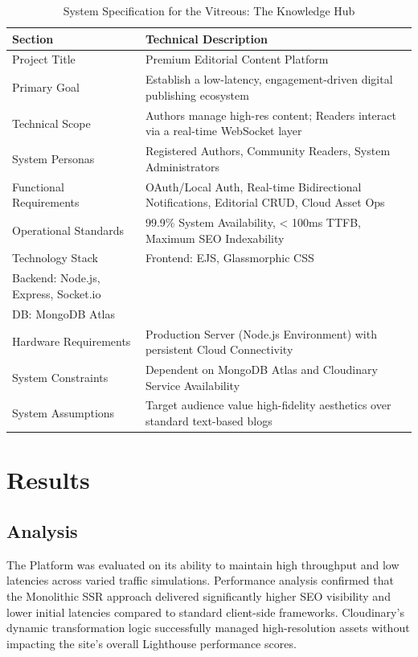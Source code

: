 \documentclass[12pt,a4paper]{report}
\begin{document}
\begin{table}[H]
\centering
\begin{tabular}{|p{4cm}|p{10cm}|}
\hline
\textbf{Section} & \textbf{Technical Description} \\
\hline
Project Title & Premium Editorial Content Platform \\
\hline
Primary Goal & Establish a low-latency, engagement-driven digital publishing ecosystem \\
\hline
Technical Scope & Authors manage high-res content; Readers interact via a real-time WebSocket layer \\
\hline
System Personas & Registered Authors, Community Readers, System Administrators \\
\hline
Functional Requirements & OAuth/Local Auth, Real-time Bidirectional Notifications, Editorial CRUD, Cloud Asset Ops \\
\hline
Operational Standards & 99.9\% System Availability, < 100ms TTFB, Maximum SEO Indexability \\
\hline
Technology Stack & Frontend: EJS, Glassmorphic CSS \\ Backend: Node.js, Express, Socket.io \\ DB: MongoDB Atlas \\
\hline
Hardware Requirements & Production Server (Node.js Environment) with persistent Cloud Connectivity \\
\hline
System Constraints & Dependent on MongoDB Atlas and Cloudinary Service Availability \\
\hline
System Assumptions & Target audience value high-fidelity aesthetics over standard text-based blogs \\
\hline
\end{tabular}
\caption{System Specification for the Vitreous: The Knowledge Hub}
\end{table}

\newpage

\chapter{Results}

\section{Analysis}

The Platform was evaluated on its ability to maintain high throughput and low latencies across varied traffic simulations. Performance analysis confirmed that the Monolithic SSR approach delivered significantly higher SEO visibility and lower initial latencies compared to standard client-side frameworks. Cloudinary's dynamic transformation logic successfully managed high-resolution assets without impacting the site's overall Lighthouse performance scores.
\end{document}
